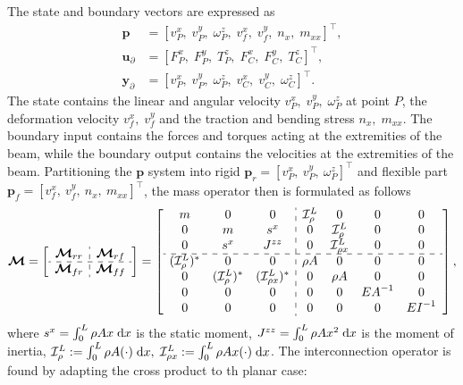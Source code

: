\documentclass{svjour3}                     %
\begin{document}
The state and boundary vectors are expressed as
\begin{align*}
\bm{p} &= [v_P^x, \; v_P^y, \; \omega_P^z, \; v_f^x, \; v_f^y, \; n_x, \; m_{xx}]^\top, \\
\bm{u}_\partial &=  [F_{P}^x, \; F_{P}^y, \; T_{P}^z, \; F_{C}^x, \; F_{C}^y, \; T_{C}^z]^\top, \\
\bm{y}_\partial &=  [v_{P}^x, \; v_{P}^y, \; \omega_{P}^z, \; v_{C}^x, \; v_{C}^y, \; \omega_{C}^z]^\top.
\end{align*}
The state contains the linear and angular velocity $v_P^x, \; v_P^y, \; \omega_P^z$ at point $P$, the deformation velocity $ v_f^x, \; v_f^y$ and the traction and bending stress $n_x, \; m_{xx}$. The boundary input contains the forces and torques acting at the extremities of the beam, while the boundary output contains the velocities at the extremities of the beam.
Partitioning the $\bm{p}$ system into rigid $\bm{p}_r = [v_P^x, \ v_P^y, \ \omega_P^z]^\top$ and flexible part $\bm{p}_f = [v_f^x, \ v_f^y, \ n_x, \ m_{xx}]^\top$, the mass operator then is formulated as follows
\begin{equation}
\label{eq:EB_M}
\bm{\mathcal{M}} = 
\left[ \begin{array}{c:c}
\bm{\mathcal{M}}_{rr} & \bm{\mathcal{M}}_{rf} \\
\hdashline
\bm{\mathcal{M}}_{fr} & \bm{\mathcal{M}}_{ff} \\
\end{array} \right] = 
\left[ \begin{array}{ccc:cccc}
m & 0 & 0 & \mathcal{I}_\rho^L & 0 & 0 & 0 \\
0 & m & s^x & 0 & \mathcal{I}_\rho^L & 0 & 0 \\
0 & s^x & J^{zz} & 0 & \mathcal{I}_{\rho x}^{L} & 0 & 0 \\
\hdashline 
(\mathcal{I}_\rho^{L})^* & 0 & 0 & \rho A & 0 & 0 & 0  \\
0 & (\mathcal{I}_\rho^{L})^* & (\mathcal{I}_{\rho x}^{L})^* & 0 & \rho A & 0 & 0  \\
0 & 0 & 0 & 0 & 0 & {EA}^{-1} & 0 \\
0 & 0 & 0 & 0 & 0 & 0 & {EI}^{-1} \\
\end{array} \right],
\end{equation}
where  $s^x = \int_{0}^{L} \rho A x \d{x}$ is the static moment, $J^{zz} = \int_{0}^{L} \rho A x^2 \d{x}$ is the moment of inertia, $\mathcal{I}_\rho^L := \int_{0}^L \rho A (\cdot) \d{x}, \; \mathcal{I}_{\rho x}^L := \int_{0}^L \rho A x (\cdot) \d{x}$. The interconnection operator is found by adapting the cross product to th planar case:
\end{document}
